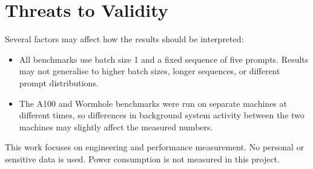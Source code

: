 \section{Threats to Validity}

Several factors may affect how the results should be interpreted:

\begin{itemize}
\item All benchmarks use batch size 1 and a fixed sequence of five prompts. Results may not generalise to higher batch sizes, longer sequences, or different prompt distributions.
\item The A100 and Wormhole benchmarks were run on separate machines at different times, so differences in background system activity between the two machines may slightly affect the measured numbers.
\end{itemize}

This work focuses on engineering and performance measurement. No personal or sensitive data is used. Power consumption is not measured in this project.
